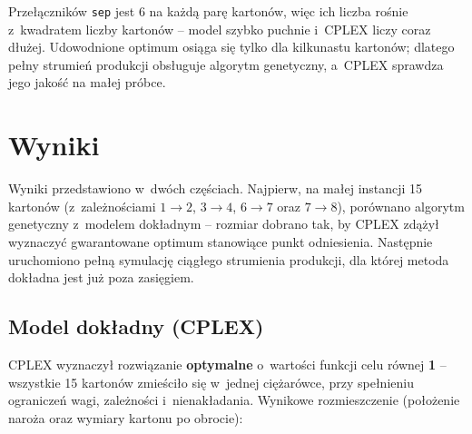\documentclass[12pt]{article}
\begin{document}
Przełączników \texttt{sep} jest 6 na każdą parę kartonów, więc ich liczba rośnie z~kwadratem liczby kartonów -- model szybko puchnie i~CPLEX liczy coraz dłużej. Udowodnione optimum osiąga się tylko dla kilkunastu kartonów; dlatego pełny strumień produkcji obsługuje algorytm genetyczny, a~CPLEX sprawdza jego jakość na małej próbce.

\section{Wyniki}

Wyniki przedstawiono w~dwóch częściach. Najpierw, na małej instancji 15 kartonów (z~zależnościami $1\!\to\!2$, $3\!\to\!4$, $6\!\to\!7$ oraz $7\!\to\!8$), porównano algorytm genetyczny z~modelem dokładnym -- rozmiar dobrano tak, by CPLEX zdążył wyznaczyć gwarantowane optimum stanowiące punkt odniesienia. Następnie uruchomiono pełną symulację ciągłego strumienia produkcji, dla której metoda dokładna jest już poza zasięgiem.

\subsection{Model dokładny (CPLEX)}

CPLEX wyznaczył rozwiązanie \textbf{optymalne} o~wartości funkcji celu równej \textbf{1} -- wszystkie 15 kartonów zmieściło się w~jednej ciężarówce, przy spełnieniu ograniczeń wagi, zależności i~nienakładania. Wynikowe rozmieszczenie (położenie naroża oraz wymiary kartonu po obrocie):
\end{document}

